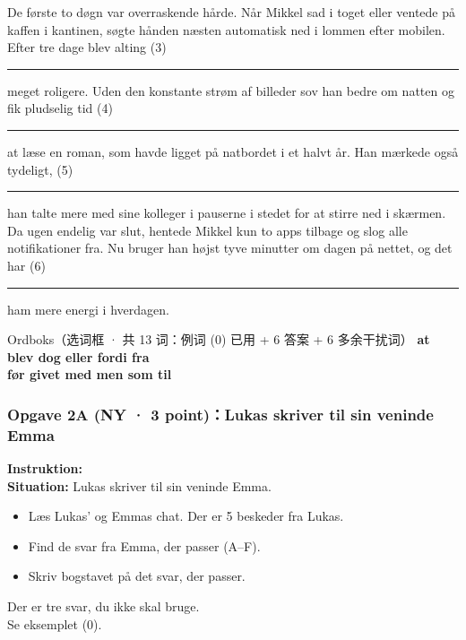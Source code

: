 De første to døgn var overraskende hårde. Når Mikkel sad i toget eller ventede på kaffen i kantinen, søgte hånden næsten automatisk ned i lommen efter mobilen. Efter tre dage blev alting (3)\ \rule{2.0cm}{0.4pt} meget roligere. Uden den konstante strøm af billeder sov han bedre om natten og fik pludselig tid (4)\ \rule{2.0cm}{0.4pt} at læse en roman, som havde ligget på natbordet i et halvt år. Han mærkede også tydeligt, (5)\ \rule{2.0cm}{0.4pt} han talte mere med sine kolleger i pauserne i stedet for at stirre ned i skærmen. Da ugen endelig var slut, hentede Mikkel kun to apps tilbage og slog alle notifikationer fra. Nu bruger han højst tyve minutter om dagen på nettet, og det har (6)\ \rule{2.0cm}{0.4pt} ham mere energi i hverdagen.

\vspace{0.35em}
\begin{grammatikbox}{Ordboks（选词框 · 共 13 词：例词 (0) 已用 + 6 答案 + 6 多余干扰词）}
\centering
\large\bfseries\color{NCDNavy}
at \qquad blev  \qquad dog \qquad eller \qquad fordi \qquad fra \\[3pt]
før \qquad givet \qquad med \qquad men \qquad som \qquad til
\end{grammatikbox}

\subsubsection*{Opgave 2A (NY · 3 point)：Lukas skriver til sin veninde Emma}

\textbf{Instruktion:}\\
\textbf{Situation:} Lukas skriver til sin veninde Emma.
\begin{itemize}
  \item Læs Lukas' og Emmas chat. Der er 5 beskeder fra Lukas.
  \item Find de svar fra Emma, der passer (A--F).
  \item Skriv bogstavet på det svar, der passer.
\end{itemize}
\hspace*{1.5em}Der er tre svar, du ikke skal bruge.\\
\hspace*{1.5em}Se eksemplet (0).

